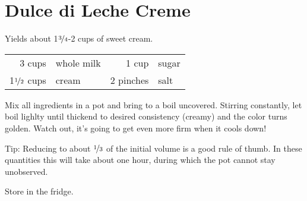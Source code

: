 
\section{Dulce di Leche Creme}
\begin{centering}
Yields about 1$\nicefrac{3}{4}$-2 cups of sweet cream.
\end{centering}
\begin{table}[H]
\centering
\begin{tabular*}{1\textwidth}{rlrl}
3 cups  & whole milk & 1 cup & sugar \\
1$\nicefrac{1}{2}$ cups & cream & 2 pinches & salt \\
\end{tabular*}
\end{table}
\begin{Notes}
\item Mix all ingredients in a pot and bring to a boil uncovered. Stirring constantly, let boil lighlty until thickend to desired consistency (creamy) and the color turns golden. Watch out, it's going to get even more firm when it cools down!
\item Tip: Reducing to about $\nicefrac{1}{3}$ of the initial volume is a good rule of thumb. In these quantities this will take about one hour, during which the pot cannot stay unobserved.
\item Store in the fridge.
\end{Notes}



